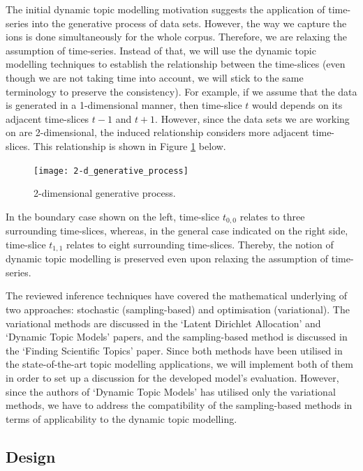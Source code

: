 \documentclass{mprop}
\begin{document}
The initial dynamic topic modelling motivation suggests the application of time-series into the generative process of data sets. However, the way we capture the ions is done simultaneously for the whole corpus. Therefore, we are relaxing the assumption of time-series. Instead of that, we will use the dynamic topic modelling techniques to establish the relationship between the time-slices (even though we are not taking time into account, we will stick to the same terminology to preserve the consistency). For example, if we assume that the data is generated in a 1-dimensional manner, then time-slice $t$ would depends on its adjacent time-slices $t-1$ and $t+1$. However, since the data sets we are working on are 2-dimensional, the induced relationship considers more adjacent time-slices. This relationship is shown in Figure \ref{fig:2-d_generative_process} below.
\begin{figure}[H]
  \centering
  \texttt{[image: 2-d\_generative\_process]}
  \caption{2-dimensional generative process.}
  \label{fig:2-d_generative_process}
\end{figure}
In the boundary case shown on the left, time-slice $t_{0,0}$ relates to  three surrounding time-slices, whereas, in the general case indicated on the right side, time-slice $t_{1,1}$ relates to eight surrounding time-slices. Thereby, the notion of dynamic topic modelling is preserved even upon relaxing the assumption of time-series.

\par The reviewed inference techniques have covered the mathematical underlying of two approaches: stochastic (sampling-based) and optimisation (variational). The variational methods are discussed in the `Latent Dirichlet Allocation' and `Dynamic Topic Models' papers, and the sampling-based method is discussed in the `Finding Scientific Topics' paper. Since both methods have been utilised in the state-of-the-art topic modelling applications, we will implement both of them in order to set up a discussion for the developed model's evaluation. However, since the authors of `Dynamic Topic Models' has utilised only the variational methods, we have to address the compatibility of the sampling-based methods in terms of applicability to the dynamic topic modelling.


\subsection{Design}
\end{document}
